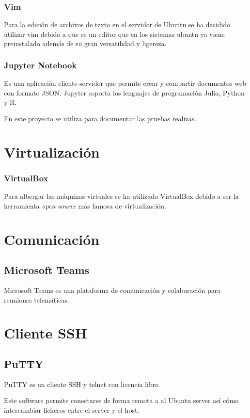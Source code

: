 \subsubsection{Vim}
Para la edición de archivos de texto en el servidor de Ubuntu se ha decidido utilizar vim debido a que es un editor que en los sistemas ubuntu ya viene preinstalado además de su gran versatilidad y ligereza.

\subsubsection{Jupyter Notebook}

Es una aplicación cliente-servidor que permite crear y compartir documentos web con formato JSON. Jupyter soporta los lenguajes de programación Julia, Python y R.

En este proyecto se utiliza para documentar las pruebas realizas.\cite{pagina:Jupyter}

\section{Virtualización}

\subsubsection{VirtualBox}
Para albergar las máquinas virtuales se ha utilizado VirtualBox debido a ser la herramienta \textit{open source} más famosa de virtualización.

\section{Comunicación}
\subsection{Microsoft Teams}
Microsoft Teams es una plataforma de comunicación y colaboración para reuniones telemáticas.

\section{Cliente SSH}
\subsection{PuTTY}
PuTTY es un cliente SSH  y telnet con licencia libre.

Este software permite conectarse de forma remota a al Ubuntu server así cómo intercambiar ficheros entre el server y el host.

